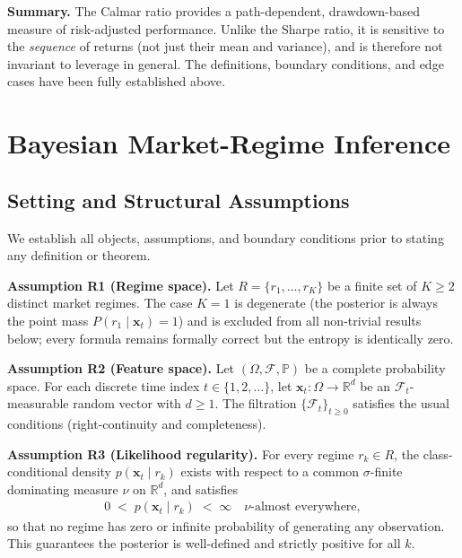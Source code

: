 \documentclass[12pt,openany]{book}
\newcommand{\R}{\mathbb{R}}
\newcommand{\bfx}{\mathbf{x}}
\newcommand{\calF}{\mathcal{F}}
\newcommand{\Prob}{\mathbb{P}}
\numberwithin{equation}{chapter}
\theoremstyle{plain}
\theoremstyle{definition}
\theoremstyle{remark}
\numberwithin{equation}{chapter}
\theoremstyle{plain}
\newcommand{\calR}{\mathcal{R}}
\def\calR{R}%
\begin{document}
\noindent
\textbf{Summary.}  The Calmar ratio provides a
path-dependent, drawdown-based measure of risk-adjusted
performance.  Unlike the Sharpe ratio, it is sensitive to
the \emph{sequence} of returns (not just their mean and
variance), and is therefore not invariant to leverage in
general.  The definitions, boundary conditions, and
edge cases have been fully established above.

\chapter{Bayesian Market-Regime Inference}
\label{ch:regime}

\section{Setting and Structural Assumptions}

\noindent
We establish all objects, assumptions, and boundary conditions
prior to stating any definition or theorem.

\medskip
\noindent\textbf{Assumption R1 (Regime space).}
Let $\calR = \{r_1, \ldots, r_K\}$ be a finite set of $K \geq 2$
distinct market regimes.  The case $K = 1$ is degenerate (the
posterior is always the point mass $P(r_1 \mid \bfx_t) = 1$) and
is excluded from all non-trivial results below; every formula
remains formally correct but the entropy is identically zero.

\medskip
\noindent\textbf{Assumption R2 (Feature space).}
Let $(\Omega, \calF, \Prob)$ be a complete probability space.
For each discrete time index $t \in \{1, 2, \ldots\}$, let
$\bfx_t : \Omega \to \R^d$ be an $\calF_t$-measurable random
vector with $d \geq 1$.  The filtration
$\{\calF_t\}_{t \geq 0}$ satisfies the usual conditions
(right-continuity and completeness).

\medskip
\noindent\textbf{Assumption R3 (Likelihood regularity).}
For every regime $r_k \in \calR$, the class-conditional density
$p(\bfx_t \mid r_k)$ exists with respect to a common
$\sigma$-finite dominating measure $\nu$ on $\R^d$, and satisfies
\begin{align}
  0 \;<\; p(\bfx_t \mid r_k) \;<\; \infty
  \quad
  \nu\text{-almost everywhere},
  \label{eq:likelihood-regularity}
\end{align}
so that no regime has zero or infinite probability of generating
any observation.  This guarantees the posterior is well-defined
and strictly positive for all $k$.
\end{document}
